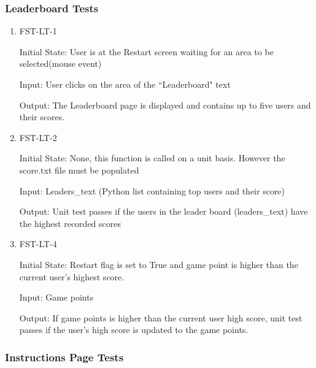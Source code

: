\documentclass[12pt, titlepage]{article}
\begin{document}
\subsubsection{Leaderboard Tests}

\begin{enumerate}

\item{FST-LT-1\\}

Initial State: User is at the Restart screen waiting for an area to be selected(mouse event)
					
Input: User clicks on the area of the ``Leaderboard" text
					
Output: The Leaderboard page is displayed and contains up to five users and their scores.
					

\item{FST-LT-2\\}
					
Initial State: None, this function is called on a unit basis. However the score.txt file must be populated
					
Input: Leaders\_text (Python list containing top users and their score)
					
Output: Unit test passes if the users in the leader board (leaders\_text) have the highest recorded scores
					

\item{FST-LT-4\\}
					
Initial State: Restart flag is set to True and game point is higher than the current user's highest score.
					
Input: Game points
					
Output: If game points is higher than the current user high score, unit test passes if the user's high score is updated to the game points.
					

\end{enumerate}






\subsubsection{Instructions Page Tests}
\end{document}
